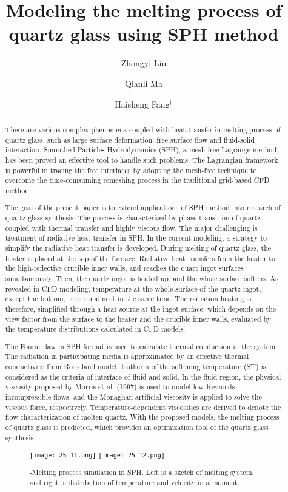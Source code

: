\documentclass[10pt]{article}
\title{Modeling the melting process of quartz glass using SPH method}
\date{}
\author[$\relax$]{Zhongyi Liu}
\author[$\relax$]{Qianli Ma}
\author[$\relax$]{Haisheng Fang$^\dagger$}
\affil[$\relax$]{Huazhong University of Science \& Technology, P.R. China}
\affil[$\relax$]{\email{\dagger}{hafang@hust.edu.cn}}
\begin{document}
\maketitle


\begin{abstract}
There are various complex phenomena coupled with heat transfer in melting process of quartz glass, such as large surface deformation, free surface flow and fluid-solid interaction. Smoothed Particles Hydrodynamics (SPH), a mesh-free Lagrange method, has been proved an effective tool to handle such problems. The Lagrangian framework is powerful in tracing the free interfaces by adopting the mesh-free technique to overcome the time-comsuming remeshing process in the traditional grid-based CFD method.

The goal of the present paper is to extend applications of SPH method into research of quartz glass synthesis. The process is characterized by phase transition of quartz coupled with thermal transfer and highly viscous flow. The major challenging is treatment of radiative heat transfer in SPH. In the current modeling, a strategy to simplify the radiative heat transfer is developed. During melting of quartz glass, the heater is placed at the top of the furnace. Radiative heat transfers from the heater to the high-reflective crucible inner walls, and reaches the quart ingot surfaces simultaneously. Then, the quartz ingot is heated up, and the whole surface softens. As revealed in CFD modeling, temperature at the whole surface of the quartz ingot, except the bottom, rises up almost in the same time. The radiation heating is, therefore, simplified through a heat source at the ingot surface, which depends on the view factor from the surface to the heater and the crucible inner walls, evaluated by the temperature distributions calculated in CFD models.

The Fourier law in SPH format is used to calculate thermal conduction in the system. The radiation in participating media is approximated by an effective thermal conductivity from Rosseland model. Isotherm of the softening temperature (ST) is considered as the criteria of interface of fluid and solid. In the fluid region, the physical viscosity proposed by Morris et al. (1997) is used to model low-Reynolds incompressible flows, and the Monaghan artificial viscosity is applied to solve the viscous force, respectively. Temperature-dependent viscosities are derived to denote the flow characterization of molten quartz. With the proposed models, the melting process of quartz glass is predicted, which provides an optimization tool of the quartz glass synthesis.

\begin{figure}[!htb]
\centering
\texttt{[image: 25-11.png]}\hspace{3em}
\texttt{[image: 25-12.png]}
\caption{-Melting process simulation in SPH. Left is a sketch of melting system, and right is distribution of temperature and velocity in a moment.}\label{fig:25}
\end{figure}

\end{abstract}



\end{document}
